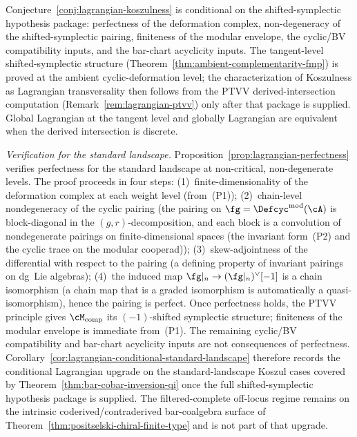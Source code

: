 \begin{remark}
\label{rem:lagrangian-conditional}
Conjecture~\ref{conj:lagrangian-koszulness} is conditional on the
shifted-symplectic hypothesis package: perfectness of the deformation
complex, non-degeneracy of the shifted-symplectic pairing, finiteness
of the modular envelope, the cyclic/BV compatibility inputs, and the
bar-chart acyclicity inputs. The tangent-level
shifted-symplectic structure
(Theorem~\ref{thm:ambient-complementarity-fmp}) is proved
at the ambient cyclic-deformation level; the characterization of Koszulness as Lagrangian
transversality then follows from the PTVV derived-intersection
computation (Remark~\ref{rem:lagrangian-ptvv}) only after that package
is supplied. Global Lagrangian at the tangent level and globally
Lagrangian are equivalent when the derived intersection is discrete.

\emph{Verification for the standard landscape.}
Proposition~\ref{prop:lagrangian-perfectness} verifies
perfectness for the standard landscape at non-critical,
non-degenerate levels. The proof proceeds in four steps:
(1)~finite-dimensionality of the deformation complex at
each weight level (from~(P1));
(2)~chain-level nondegeneracy of the cyclic pairing
(the pairing on $\fg = \Defcyc^{\mathrm{mod}}(\cA)$ is
block-diagonal in the $(g,r)$-decomposition, and each block
is a convolution of nondegenerate pairings on finite-dimensional
spaces (the invariant form~(P2) and the cyclic
trace on the modular cooperad));
(3)~skew-adjointness of the differential with respect to the
pairing (a defining property of invariant pairings on dg~Lie
algebras);
(4)~the induced map $\fg|_n \to (\fg|_n)^\vee[-1]$
is a chain isomorphism (a chain map that is a graded isomorphism
is automatically a quasi-isomorphism), hence the pairing is
perfect.
Once perfectness holds, the PTVV principle gives
$\cM_{\mathrm{comp}}$ its $(-1)$-shifted symplectic structure;
finiteness of the modular envelope is immediate from~(P1). The
remaining cyclic/BV compatibility and bar-chart acyclicity inputs are
not consequences of perfectness.
Corollary~\ref{cor:lagrangian-conditional-standard-landscape}
therefore records the conditional Lagrangian upgrade on the
standard-landscape Koszul cases covered by
Theorem~\ref{thm:bar-cobar-inversion-qi} once the full
shifted-symplectic hypothesis package is supplied. The
filtered-complete off-locus regime remains on the intrinsic
coderived/contraderived bar-coalgebra surface of
Theorem~\ref{thm:positselski-chiral-finite-type} and is not part of
that upgrade.
\end{remark}

